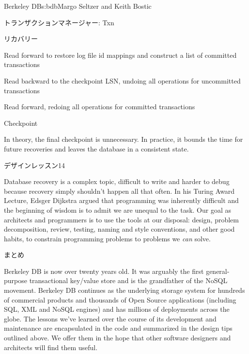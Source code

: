 \begin{aosachapter}{Berkeley DB}{s:bdb}{Margo Seltzer and Keith Bostic}
\begin{aosasect1}{トランザクションマネージャー: Txn}
\begin{aosasect2}{リカバリー}
\begin{aosaenumerate}
  \item Read forward to restore log file id mappings and construct a
  list of committed transactions

  \item Read backward to the checkpoint LSN, undoing all operations for
  uncommitted transactions

  \item Read forward, redoing all operations for committed transactions

  \item Checkpoint

\end{aosaenumerate}

\vspace{-0.2cm}

In theory, the final checkpoint is unnecessary. In practice, it bounds
the time for future recoveries and leaves the database in a consistent
state. 

\begin{aosabox}{デザインレッスン14}

Database recovery is a complex topic, difficult to write and harder to
debug because recovery simply shouldn't happen all that often. In his
Turing Award Lecture, Edsger Dijkstra argued that programming was
inherently difficult and the beginning of wisdom is to admit we are
unequal to the task. Our goal as architects and programmers is to use
the tools at our disposal: design, problem decomposition, review,
testing, naming and style conventions, and other good habits, to
constrain programming problems to problems we \emph{can} solve.

\end{aosabox}

\end{aosasect2}

\end{aosasect1}
\newpage
\begin{aosasect1}{まとめ}

Berkeley DB is now over twenty years old. It was arguably the first
general-purpose transactional key/value store and is the grandfather
of the NoSQL movement. Berkeley DB continues as the underlying storage
system for hundreds of commercial products and thousands of Open
Source applications (including SQL, XML and NoSQL engines) and has
millions of deployments across the globe. The lessons we've learned
over the course of its development and maintenance are encapsulated in
the code and summarized in the design tips outlined above. We offer
them in the hope that other software designers and architects will
find them useful.

\end{aosasect1}

\end{aosachapter}
